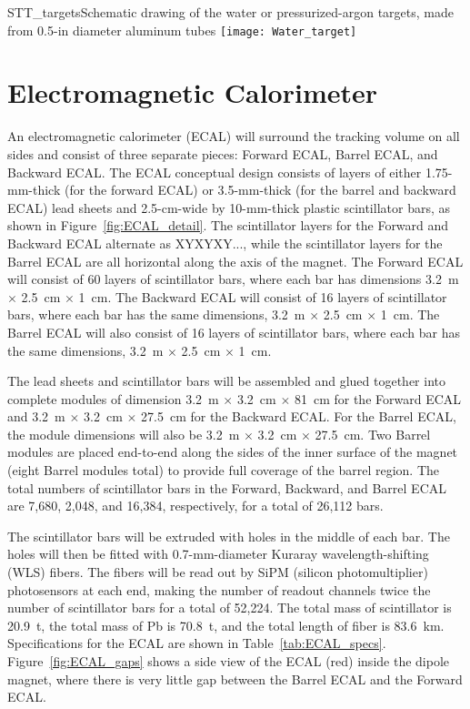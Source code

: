 \begin{cdrfigure}{STT_targets}{Schematic drawing of the water or pressurized-argon targets, 
made from 0.5-in diameter aluminum tubes}
\texttt{[image: Water\_target]}
\end{cdrfigure}

\section{Electromagnetic Calorimeter}
\label{sec:nd-nnd-emcalo}

An electromagnetic calorimeter 
(ECAL) will surround the tracking volume on all sides and consist of three separate pieces: Forward ECAL, Barrel ECAL, and Backward ECAL.  
The ECAL conceptual design 
consists of 
layers of either 1.75-mm-thick (for the forward ECAL) or 3.5-mm-thick 
(for the barrel and backward ECAL) lead sheets and 2.5-cm-wide by 10-mm-thick 
plastic scintillator bars,
as shown in Figure~\ref{fig:ECAL_detail}. The scintillator layers for the
Forward and Backward ECAL alternate as XYXYXY..., while the scintillator 
layers for the Barrel ECAL are all horizontal along the axis of the magnet.
The Forward ECAL will consist of 60 layers of scintillator bars, where each
bar has dimensions 3.2~m $\times$ 2.5~cm $\times$ 1~cm. The
Backward ECAL will consist of 16 layers of scintillator bars, where each 
bar has the same dimensions, 3.2~m $\times$ 2.5~cm $\times$ 1~cm. The Barrel ECAL will also consist 
of 16 layers of scintillator bars, where each bar has the same dimensions, 
3.2~m $\times$ 2.5~cm $\times$ 1~cm. 

The lead sheets and scintillator bars will be assembled and glued together
into complete modules of dimension 
3.2~m $\times$ 3.2~cm $\times$ 81~cm for the Forward ECAL and
3.2~m $\times$ 3.2~cm $\times$ 27.5~cm for the Backward ECAL. For the Barrel ECAL, the module 
dimensions will also be 
3.2~m $\times$ 3.2~cm $\times$ 27.5~cm. Two Barrel modules are placed end-to-end 
along the sides of the inner surface of the magnet (eight Barrel modules
total) to provide full coverage of the barrel region.
The total numbers of scintillator bars in the
Forward, Backward, and Barrel ECAL are 7,680, 2,048, and 16,384, respectively, 
for a total of 26,112 bars. 

The scintillator bars will be extruded with 
holes in the middle of each bar. The
holes will then be fitted with 0.7-mm-diameter Kuraray wavelength-shifting (WLS) fibers.
The fibers will be read out by SiPM (silicon photomultiplier) photosensors at each end, making the number of 
readout channels twice the number of scintillator bars 
for a total of 52,224. The total mass of scintillator is 20.9~t, 
the total mass of Pb is 70.8~t, and
the total length of fiber is 83.6~km.
Specifications for the ECAL are shown in Table~\ref{tab:ECAL_specs}.  
Figure~\ref{fig:ECAL_gaps} shows a side view of the ECAL (red) inside the dipole
magnet, where there is very little gap between the Barrel ECAL and the Forward ECAL.


